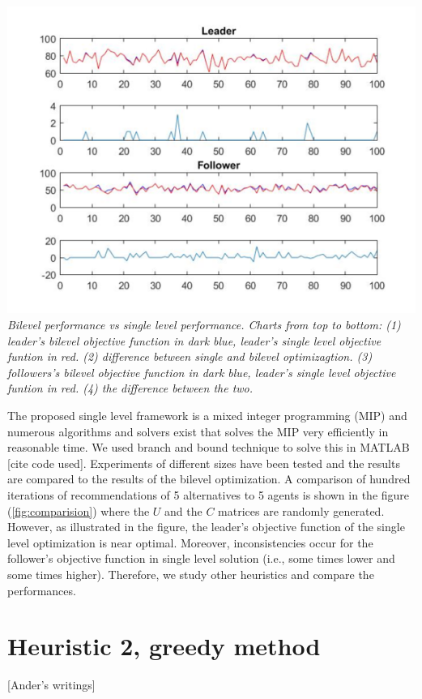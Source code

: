 \documentclass[11pt, letterpaper]{article}
\begin{document}
\includegraphics[]{comparison.png}
\\
\caption{\emph{Bilevel performance vs single level performance. Charts from top to bottom: (1) leader's bilevel objective function in dark blue, leader's single level objective funtion in red. (2) difference between single and bilevel optimizagtion. (3) followers's bilevel objective function in dark blue, leader's single level objective funtion in red. (4) the difference between the two. }}   
\label{fig:comparision}
\noindent

The proposed single level framework is a mixed integer programming (MIP) and numerous algorithms and solvers exist that solves the MIP very efficiently in reasonable time. We used branch and bound technique to solve this in MATLAB [cite code used]. Experiments of different sizes have been tested and the results are compared to the results of the bilevel optimization. A comparison of hundred iterations of recommendations of 5 alternatives to 5 agents is shown in the figure (\ref{fig:comparision}) where the $U$ and the $C$ matrices are randomly generated. However, as illustrated in the figure, the leader's objective function of the single level optimization is near optimal. Moreover, inconsistencies occur for the follower's objective function in single level solution (i.e., some times lower and some times higher). Therefore, we study other heuristics and compare the performances. 

\section{Heuristic 2, greedy method}
[Ander's writings]
\end{document}
